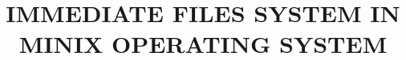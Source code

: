 \documentclass[modernstyle,12pt]{thesis}
\title{\uppercase{Immediate Files System in Minix Operating system}}
\begin{document}






\nocite{*}      %



%

\end{document}
